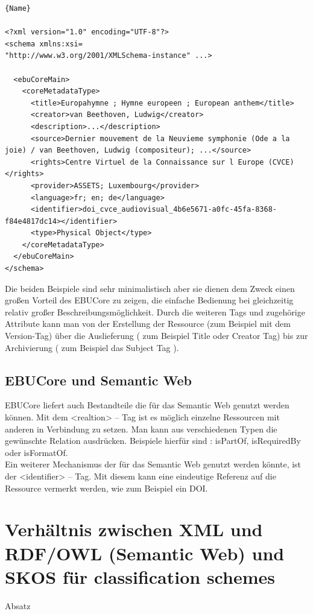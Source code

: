 \begin{lstlisting}[caption=Beispiel-XML EBUCore für die Europahymne]{Name}

<?xml version="1.0" encoding="UTF-8"?>
<schema xmlns:xsi=
"http://www.w3.org/2001/XMLSchema-instance" ...>

  <ebuCoreMain>
    <coreMetadataType>
      <title>Europahymne ; Hymne europeen ; European anthem</title>
      <creator>van Beethoven, Ludwig</creator>
      <description>...</description>
      <source>Dernier mouvement de la Neuvieme symphonie (Ode a la joie) / van Beethoven, Ludwig (compositeur); ...</source>  
      <rights>Centre Virtuel de la Connaissance sur l Europe (CVCE)</rights>
      <provider>ASSETS; Luxembourg</provider>
      <language>fr; en; de</language>
      <identifier>doi_cvce_audiovisual_4b6e5671-a0fc-45fa-8368-f84e4817dc14></identifier>
      <type>Physical Object</type>
    </coreMetadataType>
  </ebuCoreMain>
</schema>
\end{lstlisting}

Die beiden Beispiele sind sehr minimalistisch aber sie dienen dem Zweck einen großen Vorteil des EBUCore zu zeigen, die einfache Bedienung bei gleichzeitig relativ großer Beschreibungsmöglichkeit. Durch die weiteren Tags und zugehörige Attribute kann man von der Erstellung der Ressource (zum Beispiel mit dem Version-Tag) über die Auslieferung ( zum Beispiel Title oder Creator Tag)  bis zur Archivierung ( zum Beispiel das Subject Tag ).
\subsection{EBUCore und Semantic Web\\}

EBUCore liefert auch Bestandteile die für das Semantic Web genutzt werden können. Mit dem <realtion> -- Tag ist es möglich einzelne Ressourcen mit anderen in Verbindung zu setzen. Man kann aus verschiedenen Typen die gewünschte Relation ausdrücken. Beispiele hierfür sind : isPartOf, isRequiredBy oder isFormatOf.\\
Ein weiterer Mechanismus der für das Semantic Web genutzt werden könnte, ist der <identifier> -- Tag. Mit diesem kann eine eindeutige Referenz auf die Ressource vermerkt werden, wie zum Beispiel ein DOI.
	\newpage
	
	\section{Verhältnis zwischen XML und RDF/OWL (Semantic Web) und SKOS für classification schemes}
	Absatz

